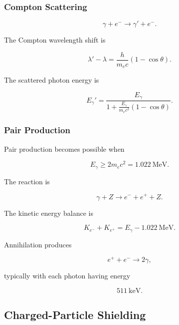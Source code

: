 \documentclass[12pt]{article}
\begin{document}
\subsubsection{Compton Scattering}

\begin{equation}
\gamma+e^-
\rightarrow
\gamma'+e^-.
\end{equation}

The Compton wavelength shift is

\begin{equation}
\boxed{
\lambda'-\lambda
=
\frac{h}{m_ec}(1-\cos\theta)
}.
\end{equation}

The scattered photon energy is

\begin{equation}
\boxed{
E_\gamma'
=
\frac{E_\gamma}
{
1+
\frac{E_\gamma}{m_ec^2}(1-\cos\theta)
}
}.
\end{equation}

\subsubsection{Pair Production}

Pair production becomes possible when

\begin{equation}
E_\gamma\geq 2m_ec^2=1.022~\mathrm{MeV}.
\end{equation}

The reaction is

\begin{equation}
\gamma+Z
\rightarrow
e^-+e^++Z.
\end{equation}

The kinetic energy balance is

\begin{equation}
K_{e^-}+K_{e^+}
=
E_\gamma-1.022~\mathrm{MeV}.
\end{equation}

Annihilation produces

\begin{equation}
e^++e^-
\rightarrow
2\gamma,
\end{equation}

typically with each photon having energy

\begin{equation}
511~\mathrm{keV}.
\end{equation}

\subsection{Charged-Particle Shielding}
\end{document}
